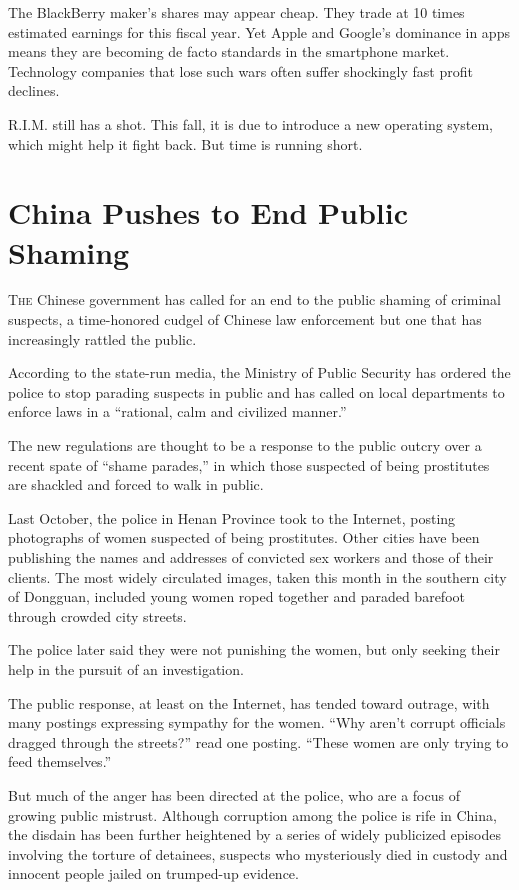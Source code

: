 ﻿\documentclass[12pt]{article}
\begin{document}
The BlackBerry maker's shares may appear cheap. They trade at 10 times estimated earnings for this
fiscal year. Yet Apple and Google's dominance in apps means they are becoming de facto standards in
the smartphone market. Technology companies that lose such wars often suffer shockingly fast profit
declines.

R.I.M. still has a shot. This fall, it is due to introduce a new operating system, which might help
it fight back. But time is running short.

\section{China Pushes to End Public Shaming}

\lettrine{T}{he} Chinese government has called for an end to the public
shaming of criminal suspects, a time-honored cudgel of Chinese law enforcement but one that has
increasingly rattled the public.

According to the state-run media, the Ministry of Public Security has ordered the police to stop
parading suspects in public and has called on local departments to enforce laws in a ``rational,
calm and civilized manner.''

The new regulations are thought to be a response to the public outcry over a recent spate of ``shame
parades,'' in which those suspected of being prostitutes are shackled and forced to walk in public.

Last October, the police in Henan Province took to the Internet, posting photographs of women
suspected of being prostitutes. Other cities have been publishing the names and addresses of
convicted sex workers and those of their clients. The most widely circulated images, taken this
month in the southern city of Dongguan, included young women roped together and paraded barefoot
through crowded city streets.

The police later said they were not punishing the women, but only seeking their help in the pursuit
of an investigation.

The public response, at least on the Internet, has tended toward outrage, with many postings
expressing sympathy for the women. ``Why aren't corrupt officials dragged through the streets?''
read one posting. ``These women are only trying to feed themselves.''

But much of the anger has been directed at the police, who are a focus of growing public mistrust.
Although corruption among the police is rife in China, the disdain has been further heightened by a
series of widely publicized episodes involving the torture of detainees, suspects who mysteriously
died in custody and innocent people jailed on trumped-up evidence.
\end{document}
